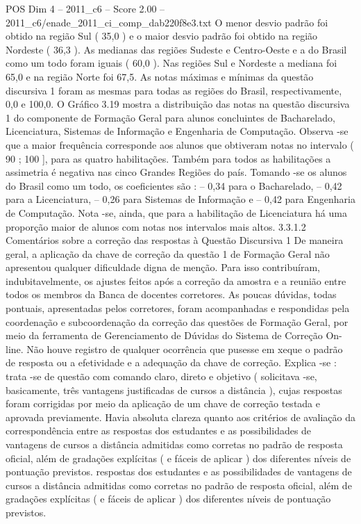 \begin{textsample}{POS Dim 4 – 2011\_c6 – Score 2.00 – 2011\_c6/enade\_2011\_ci\_comp\_dab220f8e3.txt}
O menor desvio padrão foi obtido na região Sul ( 35,0 ) e o maior desvio padrão foi obtido na região Nordeste ( 36,3 ).
As medianas das regiões Sudeste e Centro-Oeste e a do Brasil como um todo foram iguais ( 60,0 ).
Nas regiões Sul e Nordeste a mediana foi 65,0 e na região Norte foi 67,5.
As notas máximas e mínimas da questão discursiva 1 foram as mesmas para todas as regiões do Brasil, respectivamente, 0,0 e 100,0.
O Gráfico 3.19 mostra a distribuição das notas na questão discursiva 1 do componente de Formação Geral para alunos concluintes de Bacharelado, Licenciatura, Sistemas de Informação e Engenharia de Computação.
Observa -se que a maior frequência corresponde aos alunos que obtiveram notas no intervalo ( 90 ; 100 ], para as quatro habilitações.
Também para todos as habilitações a assimetria é negativa nas cinco Grandes Regiões do país.
Tomando -se os alunos do Brasil como um todo, os coeficientes são : – 0,34 para o Bacharelado, – 0,42 para a Licenciatura, – 0,26 para Sistemas de Informação e – 0,42 para Engenharia de Computação.
Nota -se, ainda, que para a habilitação de Licenciatura há uma proporção maior de alunos com notas nos intervalos mais altos. 3.3.1.2 Comentários sobre a correção das respostas à Questão Discursiva 1 De maneira geral, a aplicação da chave de correção da questão 1 de Formação Geral não apresentou qualquer dificuldade digna de menção.
Para isso contribuíram, indubitavelmente, os ajustes feitos após a correção da amostra e a reunião entre todos os membros da Banca de docentes corretores.
As poucas dúvidas, todas pontuais, apresentadas pelos corretores, foram acompanhadas e respondidas pela coordenação e subcoordenação da correção das questões de Formação Geral, por meio da ferramenta de Gerenciamento de Dúvidas do Sistema de Correção On-line.
Não houve registro de qualquer ocorrência que pusesse em xeque o padrão de resposta ou a efetividade e a adequação da chave de correção.
Explica -se : trata -se de questão com comando claro, direto e objetivo ( solicitava -se, basicamente, três vantagens justificadas de cursos a distância ), cujas respostas foram corrigidas por meio da aplicação de um chave de correção testada e aprovada previamente.
Havia absoluta clareza quanto aos critérios de avaliação da correspondência entre as respostas dos estudantes e as possibilidades de vantagens de cursos a distância admitidas como corretas no padrão de resposta oficial, além de gradações explícitas ( e fáceis de aplicar ) dos diferentes níveis de pontuação previstos. respostas dos estudantes e as possibilidades de vantagens de cursos a distância admitidas como corretas no padrão de resposta oficial, além de gradações explícitas ( e fáceis de aplicar ) dos diferentes níveis de pontuação previstos.

\end{textsample}
